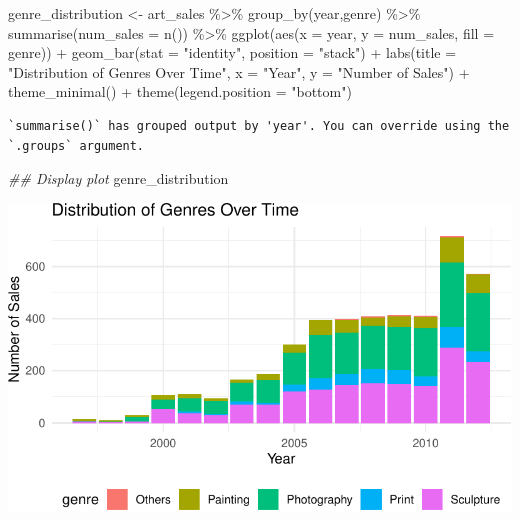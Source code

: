 \documentclass[
  12pt,
]{article}
\newenvironment{Shaded}{\begin{snugshade}}{\end{snugshade}}
\newcommand{\AttributeTok}[1]{\textcolor[rgb]{0.40,0.45,0.13}{#1}}
\newcommand{\DocumentationTok}[1]{\textcolor[rgb]{0.37,0.37,0.37}{\textit{#1}}}
\newcommand{\FunctionTok}[1]{\textcolor[rgb]{0.28,0.35,0.67}{#1}}
\newcommand{\NormalTok}[1]{\textcolor[rgb]{0.00,0.23,0.31}{#1}}
\newcommand{\OtherTok}[1]{\textcolor[rgb]{0.00,0.23,0.31}{#1}}
\newcommand{\SpecialCharTok}[1]{\textcolor[rgb]{0.37,0.37,0.37}{#1}}
\newcommand{\StringTok}[1]{\textcolor[rgb]{0.13,0.47,0.30}{#1}}
\begin{document}
\begin{Shaded}
\begin{Highlighting}[]
\NormalTok{genre\_distribution }\OtherTok{\textless{}{-}}\NormalTok{ art\_sales }\SpecialCharTok{\%\textgreater{}\%}
  \FunctionTok{group\_by}\NormalTok{(year,genre) }\SpecialCharTok{\%\textgreater{}\%}
  \FunctionTok{summarise}\NormalTok{(}\AttributeTok{num\_sales =} \FunctionTok{n}\NormalTok{()) }\SpecialCharTok{\%\textgreater{}\%}
  \FunctionTok{ggplot}\NormalTok{(}\FunctionTok{aes}\NormalTok{(}\AttributeTok{x =}\NormalTok{ year, }\AttributeTok{y =}\NormalTok{ num\_sales, }\AttributeTok{fill =}\NormalTok{ genre)) }\SpecialCharTok{+}
  \FunctionTok{geom\_bar}\NormalTok{(}\AttributeTok{stat =} \StringTok{"identity"}\NormalTok{, }\AttributeTok{position =} \StringTok{"stack"}\NormalTok{) }\SpecialCharTok{+}
  \FunctionTok{labs}\NormalTok{(}\AttributeTok{title =} \StringTok{"Distribution of Genres Over Time"}\NormalTok{, }\AttributeTok{x =} \StringTok{"Year"}\NormalTok{, }\AttributeTok{y =} \StringTok{"Number of Sales"}\NormalTok{) }\SpecialCharTok{+}
  \FunctionTok{theme\_minimal}\NormalTok{() }\SpecialCharTok{+}
  \FunctionTok{theme}\NormalTok{(}\AttributeTok{legend.position =} \StringTok{"bottom"}\NormalTok{)}
\end{Highlighting}
\end{Shaded}

\begin{verbatim}
`summarise()` has grouped output by 'year'. You can override using the
`.groups` argument.
\end{verbatim}

\begin{Shaded}
\begin{Highlighting}[]
\DocumentationTok{\#\# Display plot}
\NormalTok{genre\_distribution}
\end{Highlighting}
\end{Shaded}

\includegraphics{506-HW-5_files/figure-pdf/unnamed-chunk-9-1.pdf}
\end{document}
